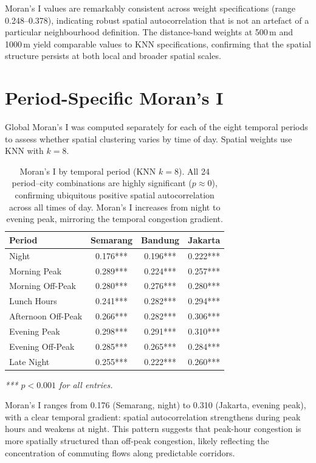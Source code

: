 \documentclass[preprint,12pt]{elsarticle}
\begin{document}
Moran's I values are remarkably consistent across weight specifications (range 0.248--0.378), indicating robust spatial autocorrelation that is not an artefact of a particular neighbourhood definition. The distance-band weights at 500\,m and 1000\,m yield comparable values to KNN specifications, confirming that the spatial structure persists at both local and broader spatial scales.

\section{Period-Specific Moran's I}
\label{sec:s2}

Global Moran's I was computed separately for each of the eight temporal periods to assess whether spatial clustering varies by time of day. Spatial weights use KNN with $k{=}8$.

\begin{table}[!htbp]
\centering
\caption{Moran's I by temporal period (KNN $k{=}8$). All 24 period--city combinations are highly significant ($p \approx 0$), confirming ubiquitous positive spatial autocorrelation across all times of day. Moran's I increases from night to evening peak, mirroring the temporal congestion gradient.}
\label{tab:s2}
\begin{tabular}{lccc}
\toprule
Period & Semarang & Bandung & Jakarta \\
\midrule
Night             & 0.176*** & 0.196*** & 0.222*** \\
Morning Peak      & 0.289*** & 0.224*** & 0.257*** \\
Morning Off-Peak  & 0.280*** & 0.276*** & 0.280*** \\
Lunch Hours       & 0.241*** & 0.282*** & 0.294*** \\
Afternoon Off-Peak& 0.266*** & 0.282*** & 0.306*** \\
Evening Peak      & 0.298*** & 0.291*** & 0.310*** \\
Evening Off-Peak  & 0.285*** & 0.265*** & 0.284*** \\
Late Night        & 0.255*** & 0.222*** & 0.260*** \\
\bottomrule
\end{tabular}

\smallskip
\noindent\textit{*** $p < 0.001$ for all entries.}
\end{table}

Moran's I ranges from 0.176 (Semarang, night) to 0.310 (Jakarta, evening peak), with a clear temporal gradient: spatial autocorrelation strengthens during peak hours and weakens at night. This pattern suggests that peak-hour congestion is more spatially structured than off-peak congestion, likely reflecting the concentration of commuting flows along predictable corridors.
\end{document}
